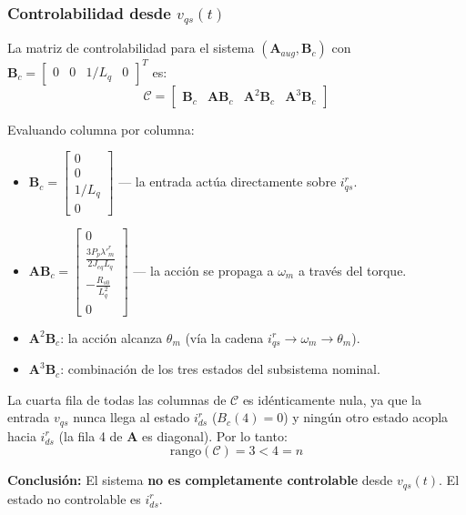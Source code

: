 \documentclass[12pt, a4paper,journal, onecolumn, compsoc]{IEEEtran}
\begin{document}
\subsubsection{Controlabilidad desde \texorpdfstring{$v_{qs}(t)$}{v_qs(t)}}
La matriz de controlabilidad para el sistema $(\mathbf{A}_{aug}, \mathbf{B}_c)$ con $\mathbf{B}_c = \begin{bmatrix} 0 & 0 & 1/L_q & 0 \end{bmatrix}^T$ es:
\begin{equation}
    \mathcal{C} = \begin{bmatrix} \mathbf{B}_c & \mathbf{A}\mathbf{B}_c & \mathbf{A}^2\mathbf{B}_c & \mathbf{A}^3\mathbf{B}_c \end{bmatrix}
\end{equation}

Evaluando columna por columna:
\begin{itemize}
    \item $\mathbf{B}_c = \begin{bmatrix} 0 \\ 0 \\ 1/L_q \\ 0 \end{bmatrix}$ --- la entrada actúa directamente sobre $i_{qs}^r$.
    \item $\mathbf{A}\mathbf{B}_c = \begin{bmatrix} 0 \\ \frac{3P_p\lambda'^r_m}{2J_{eq}L_q} \\ -\frac{R_{s0}}{L_q^2} \\ 0 \end{bmatrix}$ --- la acción se propaga a $\omega_m$ a través del torque.
    \item $\mathbf{A}^2\mathbf{B}_c$: la acción alcanza $\theta_m$ (vía la cadena $i_{qs}^r \to \omega_m \to \theta_m$).
    \item $\mathbf{A}^3\mathbf{B}_c$: combinación de los tres estados del subsistema nominal.
\end{itemize}

La cuarta fila de todas las columnas de $\mathcal{C}$ es idénticamente nula, ya que la entrada $v_{qs}$ nunca llega al estado $i_{ds}^r$ ($B_c(4) = 0$) y ningún otro estado acopla hacia $i_{ds}^r$ (la fila 4 de $\mathbf{A}$ es diagonal). Por lo tanto:
\begin{equation}
    \text{rango}(\mathcal{C}) = 3 < 4 = n
\end{equation}

\textbf{Conclusión:} El sistema \textbf{no es completamente controlable} desde $v_{qs}(t)$. El estado no controlable es $i_{ds}^r$.
\end{document}
